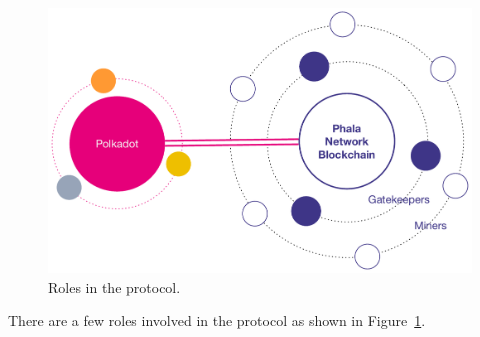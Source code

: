 \begin{figure}[!t]
    \centering \footnotesize
    \includegraphics[width=\columnwidth]{img/pLIBRA-roles}
    \caption{Roles in the protocol.}
    \label{fig:roles}
\end{figure}

There are a few roles involved in the protocol as shown in Figure~\ref{fig:roles}.

